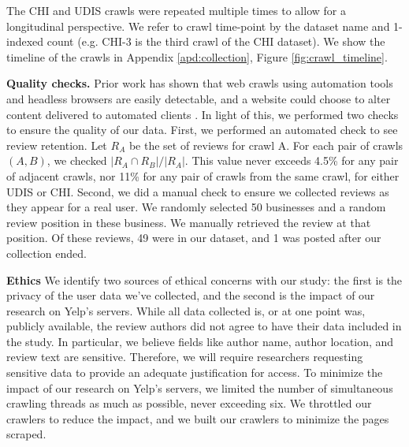 The CHI and UDIS crawls were repeated multiple times to allow for a longitudinal perspective. We refer to crawl time-point by the dataset name and 1-indexed count (e.g. CHI-3 is the third crawl of the CHI dataset). We show the timeline of the crawls in Appendix \ref{apd:collection}, Figure \ref{fig:crawl_timeline}.


\textbf{Quality checks.}
Prior work has shown that web crawls using automation tools and headless browsers are easily detectable, and a website could choose to alter content delivered to automated clients \cite{jueckstock2021towards}. In light of this, we performed two checks to ensure the quality of our data. First, we performed an automated check to see review retention. Let $R_A$ be the set of reviews for crawl A. For each pair of crawls $(A,B)$, we checked $\left|R_A \cap R_B\right| / \left|R_A\right|$. This value never exceeds 4.5\% for any pair of adjacent crawls, nor 11\% for any pair of crawls from the same crawl, for either UDIS or CHI. Second, we did a manual check to ensure we collected reviews as they appear for a real user. We randomly selected 50 businesses and a random review position in these business. We manually retrieved the review at that position. Of these reviews, 49 were in our dataset, and 1 was posted after our collection ended.

\textbf{Ethics}
We identify two sources of ethical concerns with our study: the first is the privacy of the user data we've collected, and the second is the impact of our research on Yelp's servers. While all data collected is, or at one point was, publicly available, the review authors did not agree to have their data included in the study. In particular, we believe fields like author name, author location, and review text are sensitive. Therefore, we will require researchers requesting sensitive data to provide an adequate justification for access. To minimize the impact of our research on Yelp's servers, 
we limited the number of simultaneous crawling threads as much as possible, never exceeding six. We throttled our crawlers to reduce the impact, and we built our crawlers to minimize the pages scraped.



